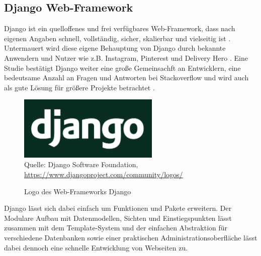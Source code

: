 \documentclass[12pt,oneside,titlepage,listof=totoc,bibliography=totoc]{scrartcl}
\begin{document}
\subsection{Django Web-Framework}

Django ist ein quelloffenes und frei verfügbares Web-Framework, dass nach eigenen Angaben schnell, vollständig, sicher, skalierbar und vielseitig ist \parencite[]{54-django-overview}. Untermauert wird diese eigene Behauptung von Django durch bekannte Anwendern und Nutzer wie z.B. Instagram, Pinterest und Delivery Hero \parencite{56-django-stackshare}. Eine Studie bestätigt Django weiter eine große Gemeinsachft an Entwicklern, eine bedeutsame Anzahl an Fragen und Antworten bei Stackoverflow und wird auch als gute Lösung für größere Projekte betrachtet \parencite{55-djnago-ghimire}. 

\begin{figure}[H]
	\caption{Logo des Web-Frameworks Django}\label{fig:django-logo}
	\includegraphics[width=0.6\textwidth]{django-logo-negative.png}
	\\
	Quelle: Django Software Foundation, \url{https://www.djangoproject.com/community/logos/}
\end{figure}

Django lässt sich dabei einfach um Funktionen und Pakete erweitern. Der Modulare Aufbau mit Datenmodellen, Sichten und Einstiegspunkten lässt zusammen mit dem Template-System und der einfachen Abstraktion für verschiedene Datenbanken sowie einer praktischen Administrationsoberfläche lässt dabei dennoch eine schnelle Entwicklung von Webseiten zu.



\end{document}
